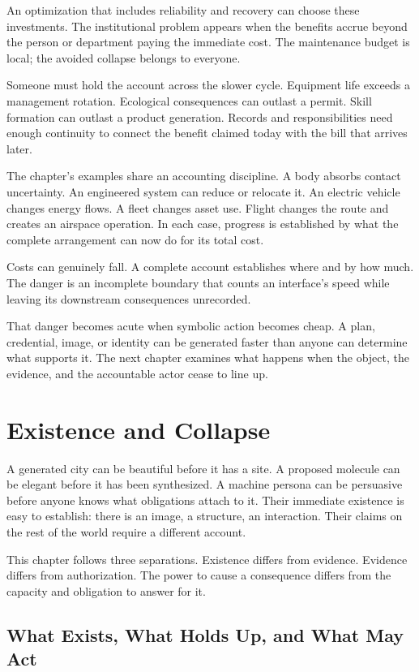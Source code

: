 \documentclass[11pt,openany]{book}
\begin{document}
An optimization that includes reliability and recovery can choose these investments. The institutional problem appears when the benefits accrue beyond the person or department paying the immediate cost. The maintenance budget is local; the avoided collapse belongs to everyone.

Someone must hold the account across the slower cycle. Equipment life exceeds a management rotation. Ecological consequences can outlast a permit. Skill formation can outlast a product generation. Records and responsibilities need enough continuity to connect the benefit claimed today with the bill that arrives later.

The chapter's examples share an accounting discipline. A body absorbs contact uncertainty. An engineered system can reduce or relocate it. An electric vehicle changes energy flows. A fleet changes asset use. Flight changes the route and creates an airspace operation. In each case, progress is established by what the complete arrangement can now do for its total cost.

Costs can genuinely fall. A complete account establishes where and by how much. The danger is an incomplete boundary that counts an interface's speed while leaving its downstream consequences unrecorded.

That danger becomes acute when symbolic action becomes cheap. A plan, credential, image, or identity can be generated faster than anyone can determine what supports it. The next chapter examines what happens when the object, the evidence, and the accountable actor cease to line up.

\chapter{Existence and Collapse}

A generated city can be beautiful before it has a site. A proposed molecule can be elegant before it has been synthesized. A machine persona can be persuasive before anyone knows what obligations attach to it. Their immediate existence is easy to establish: there is an image, a structure, an interaction. Their claims on the rest of the world require a different account.

This chapter follows three separations. Existence differs from evidence. Evidence differs from authorization. The power to cause a consequence differs from the capacity and obligation to answer for it.

\section{What Exists, What Holds Up, and What May Act}
\end{document}
